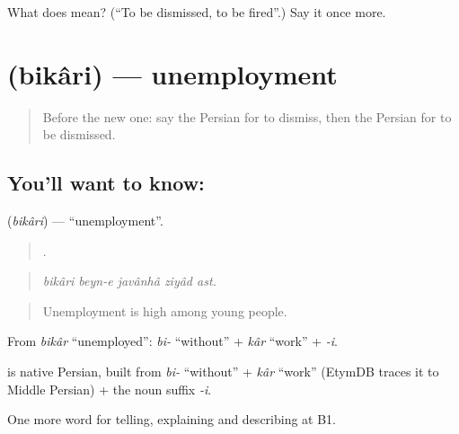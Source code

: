 \begin{tcolorbox}[breakable,colback=teal!4,colframe=teal!35!black,title={Before you move on}]
What does   mean? (\textquotedblleft{}To be dismissed, to be fired\textquotedblright{}.) Say it once more.
\end{tcolorbox}
\section[\texorpdfstring{\fa{بیکاری} (bikâri)}{بیکاری (bikâri)}]{ (bikâri) — unemployment}

\label{lesson:FA-C379-bikari}



\begin{quote}
Before the new one: say the Persian for to dismiss, then the Persian for to be dismissed.
\end{quote}

\subsection*{You'll want to know: }
\textbf{} (\emph{bikâri}) — \textquotedblleft{}unemployment\textquotedblright{}.

\begin{quote}
    .
\end{quote}

\begin{quote}
\emph{bikâri beyn-e javânhâ ziyâd ast.}
\end{quote}

\begin{quote}
Unemployment is high among young people.
\end{quote}

From \emph{bikâr} \textquotedblleft{}unemployed\textquotedblright{}: \emph{bi-} \textquotedblleft{}without\textquotedblright{} + \emph{kâr} \textquotedblleft{}work\textquotedblright{} + \emph{-i}.

\begin{cousinweb}
\textbf{} is native Persian, built from \emph{bi-} \textquotedblleft{}without\textquotedblright{} + \emph{kâr} \textquotedblleft{}work\textquotedblright{} (EtymDB traces it to Middle Persian) + the noun suffix \emph{-i}.
\end{cousinweb}

\begin{grammarlens}[title={What you've built}]
One more word for telling, explaining and describing at B1.
\end{grammarlens}

